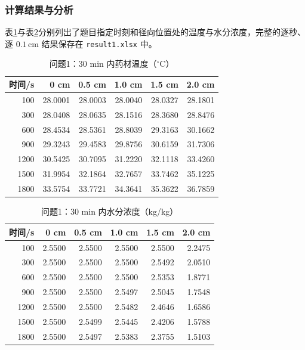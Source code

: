 \documentclass[12pt,a4paper,fontset=none]{ctexart}
\begin{document}
\subsubsection{计算结果与分析}
表\ref{tab:q1t}与表\ref{tab:q1c}分别列出了题目指定时刻和径向位置处的温度与水分浓度，完整的逐秒、逐 $0.1\,\mathrm{cm}$ 结果保存在 \texttt{result1.xlsx} 中。

\begin{table}[H]
\centering
\caption{问题1：30 min 内药材温度（$^\circ$C）}\label{tab:q1t}
\small
\begin{tabular}{rrrrrr}
\toprule
时间/s & 0 cm & 0.5 cm & 1.0 cm & 1.5 cm & 2.0 cm \\
\midrule
100 & 28.0001 & 28.0003 & 28.0040 & 28.0327 & 28.1801 \\
300 & 28.0408 & 28.0635 & 28.1516 & 28.3680 & 28.8476 \\
600 & 28.4534 & 28.5361 & 28.8039 & 29.3163 & 30.1662 \\
900 & 29.3243 & 29.4583 & 29.8756 & 30.6159 & 31.7306 \\
1200 & 30.5425 & 30.7095 & 31.2220 & 32.1118 & 33.4260 \\
1500 & 31.9954 & 32.1864 & 32.7657 & 33.7462 & 35.1225 \\
1800 & 33.5754 & 33.7721 & 34.3641 & 35.3622 & 36.7859 \\
\bottomrule
\end{tabular}
\end{table}

\begin{table}[H]
\centering
\caption{问题1：30 min 内水分浓度（kg/kg）}\label{tab:q1c}
\small
\begin{tabular}{rrrrrr}
\toprule
时间/s & 0 cm & 0.5 cm & 1.0 cm & 1.5 cm & 2.0 cm \\
\midrule
100 & 2.5500 & 2.5500 & 2.5500 & 2.5500 & 2.2475 \\
300 & 2.5500 & 2.5500 & 2.5500 & 2.5492 & 2.0510 \\
600 & 2.5500 & 2.5500 & 2.5500 & 2.5353 & 1.8771 \\
900 & 2.5500 & 2.5500 & 2.5497 & 2.5045 & 1.7548 \\
1200 & 2.5500 & 2.5500 & 2.5482 & 2.4646 & 1.6586 \\
1500 & 2.5500 & 2.5499 & 2.5445 & 2.4206 & 1.5788 \\
1800 & 2.5500 & 2.5497 & 2.5383 & 2.3755 & 1.5103 \\
\bottomrule
\end{tabular}
\end{table}
\end{document}
